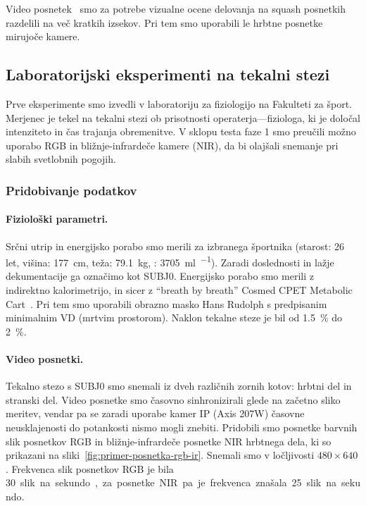 Video posnetek~\cite{squashtv2014squash} smo za potrebe vizualne ocene delovanja na squash posnetkih razdelili na več kratkih izsekov. Pri tem smo uporabili le hrbtne posnetke mirujoče kamere. 







\subsection{Laboratorijski eksperimenti na tekalni stezi}
Prve eksperimente smo izvedli v laboratoriju za fiziologijo na Fakulteti za šport. Merjenec je tekel na tekalni stezi ob prisotnosti operaterja---fiziologa, ki je določal intenziteto in čas trajanja obremenitve. V sklopu testa faze 1 smo preučili možno uporabo RGB in bližnje-infrardeče kamere (NIR), da bi olajšali snemanje pri slabih svetlobnih pogojih.


\subsubsection{Pridobivanje podatkov}
\paragraph{Fiziolo\v{s}ki parametri.}
Srčni utrip in energijsko porabo smo merili za izbranega športnika (starost: 26 let, višina: \SI{177}{\cm}, teža: \SI{79.1}{\kg}, \vomax: \SI{3705}{\ml\per\min}). Zaradi doslednosti in lažje dekumentacije ga označimo kot SUBJ0. Energijsko porabo smo merili z indirektno kalorimetrijo, in sicer z ``breath by breath'' Cosmed CPET Metabolic Cart~\cite{beaver1973line}. Pri tem smo uporabili obrazno masko Hans Rudolph s predpisanim minimalnim VD (mrtvim prostorom). Naklon tekalne steze je bil od \SI{1.5}{\%} do \SI{2}{\%}.

\paragraph{Video posnetki.}
Tekalno stezo s SUBJ0 smo snemali iz dveh različnih zornih kotov: hrbtni del in stranski del. Video posnetke smo časovno sinhronizirali glede na začetno sliko meritev, vendar pa se zaradi uporabe kamer IP (Axis 207W) časovne neusklajenosti do potankosti nismo mogli znebiti. Pridobili smo posnetke barvnih slik posnetkov RGB in bližnje-infrardeče posnetke NIR hrbtnega dela, ki so prikazani na sliki~\ref{fig:primer-posnetka-rgb-ir}. Snemali smo v ločljivosti $480 \times 640$. Frekvenca slik posnetkov RGB je bila \SI{30} slik na sekundo, za posnetke NIR pa je frekvenca znašala \SI{25} slik na sekundo.  

